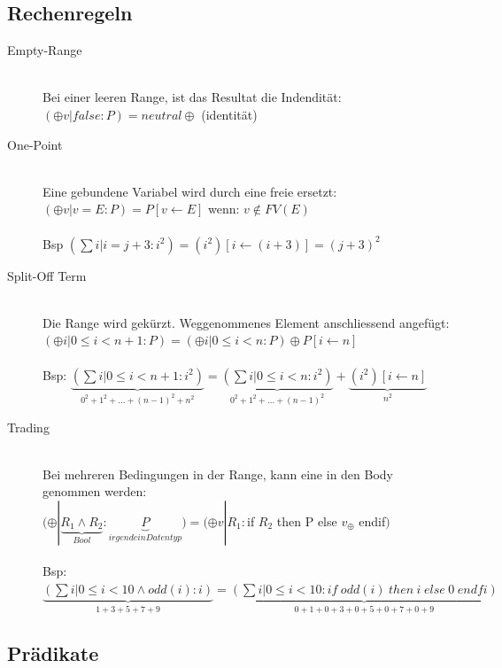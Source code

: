 \documentclass[a4paper,10pt]{article}
\newcommand{\la}{\leftarrow}
\begin{document}
\subsection{Rechenregeln}
\begin{description}
	\item[Empty-Range] \hfill \\
		Bei einer leeren Range, ist das Resultat die Indendit\"at: \\
		 $(\oplus v | false : P) = neutral\oplus$ (identit\"at)
	\item[One-Point] \hfill \\
		Eine gebundene Variabel wird durch eine freie ersetzt: \\
		$(\oplus v | v=E : P) = P[v \la E]$ wenn: $v  \notin FV(E)$ \\ \\
		Bsp $(\sum i | i = j + 3 :i^2)=(i^2)[i \la (i+3)]=(j+3)^2$
	\item [Split-Off Term] \hfill \\
		Die Range wird gek\"urzt. Weggenommenes Element anschliessend angef\"ugt: \\
		$(\oplus i | 0 \leq i < n+1:P)=(\oplus i | 0 \leq i < n : P) \oplus P[i \la n]$ \\ \\
		Bsp: $\underbrace{(\sum i | 0 \leq i < n+1:i^2)}_{0^2+1^2+...+(n-1)^2+n^2} = \underbrace{(\sum i | 0 \leq i < n : i^2)}_{0^2+1^2+...+(n-1)^2} + \underbrace{(i^2)[i \la n]}_{n^2}$
	\item[Trading] \hfill \\
		Bei mehreren Bedingungen in der Range, kann eine in den Body genommen werden: \\
		$(\oplus | \underbrace{R_1 \wedge R_2}_{Bool}:\underbrace{P}_{irgendein Datentyp}) = (\oplus v | R_1:$if $R_2$ then P else $v_{\oplus}$ endif$)$ \\ \\
		Bsp: $\underbrace{(\sum i | 0 \leq  i < 10 \wedge odd(i) : i )}_{1+3+5+7+9} = \underbrace{(\sum i | 0 \leq i < 10 :  if \hspace{3pt} odd(i) \hspace{3pt} then \hspace{3pt} i \hspace{3pt} else \hspace{3pt} 0 \hspace{3pt} endfi)}_{0+1+0+3+0+5+0+7+0+9}$
\end{description}

\subsection{Pr\"adikate}
\end{document}
